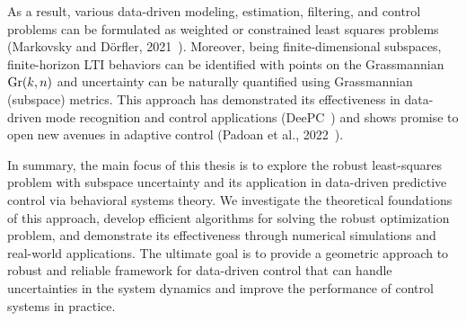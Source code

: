 As a result, various data-driven modeling, estimation, filtering, and control problems can be formulated as weighted or constrained least squares problems (Markovsky and D\"orfler, 2021~\cite{markovsky2021}). Moreover, being finite-dimensional subspaces, finite-horizon LTI behaviors can be identified with points on the Grassmannian $\text{Gr}(k, n)$ and uncertainty can be naturally quantified using Grassmannian (subspace) metrics. This approach has demonstrated its effectiveness in data-driven mode recognition and control applications (DeePC~\cite{jeremy2019}) and shows promise to open new avenues in adaptive control (Padoan et al., 2022~\cite{padoan2022}).

In summary, the main focus of this thesis is to explore the robust least-squares problem with subspace uncertainty and its application in data-driven predictive control via behavioral systems theory. We investigate the theoretical foundations of this approach, develop efficient algorithms for solving the robust optimization problem, and demonstrate its effectiveness through numerical simulations and real-world applications. The ultimate goal is to provide a geometric approach to robust and reliable framework for data-driven control that can handle uncertainties in the system dynamics and improve the performance of control systems in practice.